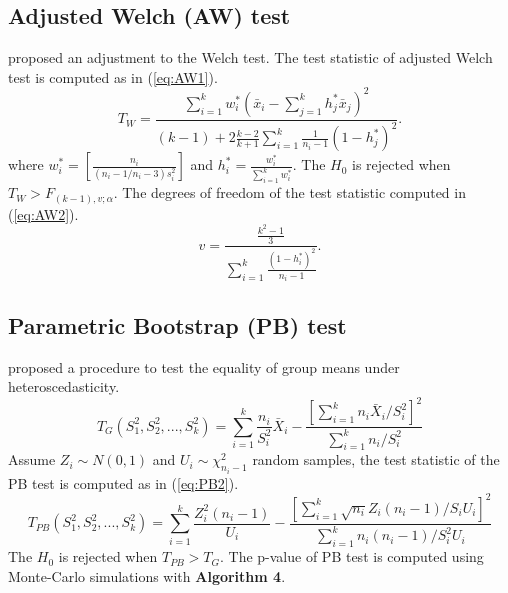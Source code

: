 \subsection{Adjusted Welch (AW) test}

\cite{hartung:2002} proposed an adjustment to the Welch test. The test statistic of adjusted Welch test is computed as in (\ref{eq:AW1}).
\begin{equation}
T_W=\frac{\sum_{i=1}^k w_i^* (\bar{x}_i-\sum_{j=1}^k h_j^*\bar{x}_j)^2}{(k-1)+2\frac{k-2}{k+1}\sum_{i=1}^k \frac{1}{n_i-1}(1-h_j^*)^2}
\label{eq:AW1}.
\end{equation}
where $w_i^*=[\frac{n_i}{(n_i-1/n_i-3)s_i^2}]$ and $h_i^*=\frac{w_i^*}{\sum_{i=1}^k w_i^*}$. The $H_0$ is rejected when $T_W>F_{(k-1), v; \alpha}$. The degrees of freedom of the test statistic computed in (\ref{eq:AW2}).
\begin{equation}
v=\frac{\frac{k^2-1}{3}}{\sum_{i=1}^k \frac{(1-h_i^*)^2}{n_i-1}} \label{eq:AW2}.
\end{equation}
\subsection{Parametric Bootstrap (PB) test}

\cite{krish:2007} proposed a procedure to test the equality of group means under heteroscedasticity.
\begin{equation}
T_G(S_1^2, S_2^2, ..., S_k^2)=\sum_{i=1}^k \frac{n_i}{S_i^2}\bar{X}_i-\frac{[\sum_{i=1}^k n_i\bar{X}_i/S_i^2]^2}{\sum_{i=1}^k n_i/S_i^2}
\end{equation}
Assume $Z_i \sim N(0, 1)$ and $U_i \sim \chi^2_{n_i-1}$ random samples, the test statistic of the PB test is computed as in (\ref{eq:PB2}).
\begin{equation}
\label{eq:PB2}
T_{PB}(S_1^2, S_2^2, ..., S_k^2)=\sum_{i=1}^k \frac{Z_i^2 (n_i-1)}{U_i}-\frac{[\sum_{i=1}^k \sqrt{n_i}Z_i(n_i-1)/S_iU_i]^2}{\sum_{i=1}^k n_i(n_i-1)/S_i^2U_i}
\end{equation}
The $H_0$ is rejected when $T_{PB}>T_G$. The p-value of PB test is computed using Monte-Carlo simulations with \textbf{Algorithm 4}.

